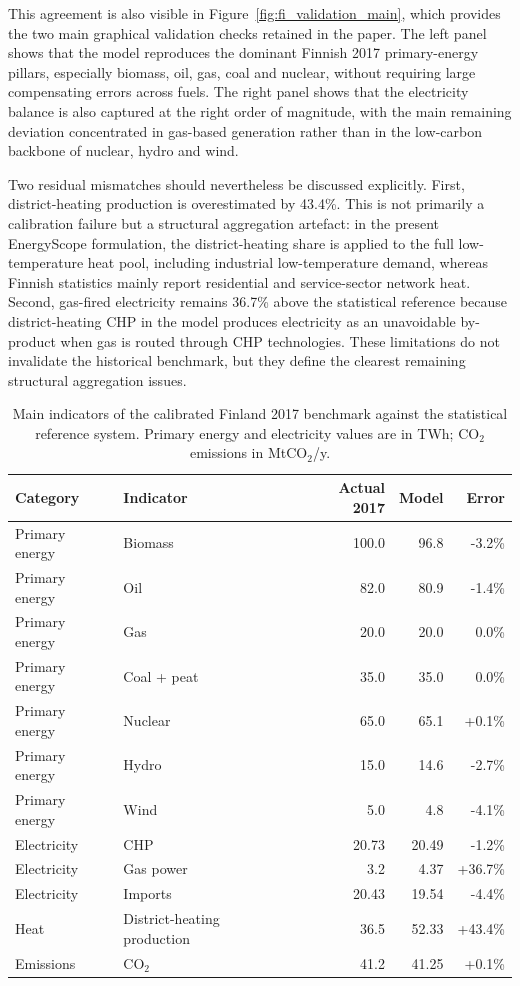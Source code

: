 \documentclass{article}
\begin{document}
This agreement is also visible in Figure~\ref{fig:fi_validation_main}, which provides the two main graphical validation checks retained in the paper. The left panel shows that the model reproduces the dominant Finnish 2017 primary-energy pillars, especially biomass, oil, gas, coal and nuclear, without requiring large compensating errors across fuels. The right panel shows that the electricity balance is also captured at the right order of magnitude, with the main remaining deviation concentrated in gas-based generation rather than in the low-carbon backbone of nuclear, hydro and wind.

Two residual mismatches should nevertheless be discussed explicitly. First, district-heating production is overestimated by 43.4\%. This is not primarily a calibration failure but a structural aggregation artefact: in the present EnergyScope formulation, the district-heating share is applied to the full low-temperature heat pool, including industrial low-temperature demand, whereas Finnish statistics mainly report residential and service-sector network heat. Second, gas-fired electricity remains 36.7\% above the statistical reference because district-heating CHP in the model produces electricity as an unavoidable by-product when gas is routed through CHP technologies. These limitations do not invalidate the historical benchmark, but they define the clearest remaining structural aggregation issues.

\begin{table}[H]
  \centering
  \small
  \begin{tabularx}{\linewidth}{llrrr}
    \toprule
    \textbf{Category} & \textbf{Indicator} & \textbf{Actual 2017} & \textbf{Model} & \textbf{Error} \\
    \midrule
    Primary energy & Biomass & 100.0 & 96.8 & -3.2\% \\
    Primary energy & Oil & 82.0 & 80.9 & -1.4\% \\
    Primary energy & Gas & 20.0 & 20.0 & 0.0\% \\
    Primary energy & Coal + peat & 35.0 & 35.0 & 0.0\% \\
    Primary energy & Nuclear & 65.0 & 65.1 & +0.1\% \\
    Primary energy & Hydro & 15.0 & 14.6 & -2.7\% \\
    Primary energy & Wind & 5.0 & 4.8 & -4.1\% \\
    Electricity & CHP & 20.73 & 20.49 & -1.2\% \\
    Electricity & Gas power & 3.2 & 4.37 & +36.7\% \\
    Electricity & Imports & 20.43 & 19.54 & -4.4\% \\
    Heat & District-heating production & 36.5 & 52.33 & +43.4\% \\
    Emissions & CO$_2$ & 41.2 & 41.25 & +0.1\% \\
    \bottomrule
  \end{tabularx}
  \caption{Main indicators of the calibrated Finland 2017 benchmark against the statistical reference system. Primary energy and electricity values are in TWh; CO$_2$ emissions in MtCO$_2$/y.}
  \label{tab:fi_validation_2017}
\end{table}
\end{document}
